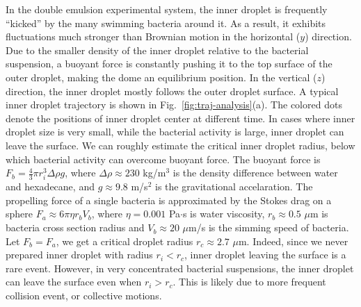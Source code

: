 \documentclass[%
10pt,
superscriptaddress,
twocolumn,
 amsmath,amssymb,
 aps,prx,
]{revtex4-2}
\begin{document}
In the double emulsion experimental system, the inner droplet is frequently ``kicked'' by the many swimming bacteria around it.
As a result, it exhibits fluctuations much stronger than Brownian motion in the horizontal ($y$) direction.
Due to the smaller density of the inner droplet relative to the bacterial suspension, a buoyant force is constantly pushing it to the top surface of the outer droplet, making the dome an equilibrium position.
In the vertical ($z$) direction, the inner droplet mostly follows the outer droplet surface.
A typical inner droplet trajectory is shown in Fig.~\ref{fig:traj-analysis}(a).
The colored dots denote the positions of inner droplet center at different time.
In cases where inner droplet size is very small, while the bacterial activity is large, inner droplet can leave the surface.
We can roughly estimate the critical inner droplet radius, below which bacterial activity can overcome buoyant force.
The buoyant force is $F_b = \frac{4}{3}\pi r_i^3\Delta\rho g$, where $\Delta\rho\approx 230$ kg/m$^3$ is the density difference between water and hexadecane, and $g\approx 9.8$ m/s$^2$ is the gravitational accelaration.
The propelling force of a single bacteria is approximated by the Stokes drag on a sphere $F_a \approx 6\pi\eta r_b V_b$, where $\eta=0.001$ Pa$\cdot$s is water viscosity, $r_b\approx 0.5$ $\mu$m is bacteria cross section radius and $V_b \approx 20$ $\mu$m/s is the simming speed of bacteria.
Let $F_b=F_a$, we get a critical droplet radius $r_c \approx 2.7$ $\mu$m.
Indeed, since we never prepared inner droplet with radius $r_i < r_c$, inner droplet leaving the surface is a rare event.
However, in very concentrated bacterial suspensions, the inner droplet can leave the surface even when $r_i > r_c$.
This is likely due to more frequent collision event, or collective motions.
\end{document}
